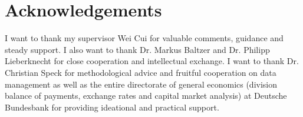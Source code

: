 \section*{Acknowledgements}
I want to thank my supervisor Wei Cui for valuable comments, guidance and steady support. I also want to thank Dr. Markus Baltzer and Dr. Philipp Lieberknecht for close cooperation and intellectual exchange. I want to thank Dr. Christian Speck for methodological advice and fruitful cooperation on data management as well as the entire directorate of general economics (division balance of payments, exchange rates and capital market analysis) at Deutsche Bundesbank for providing ideational and practical support.